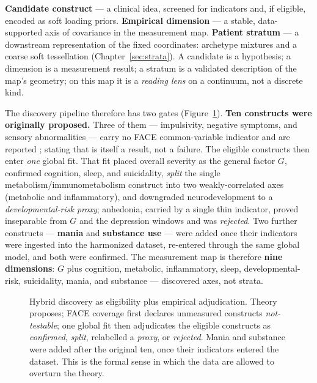 \begin{definitionbox}
\textbf{Candidate construct} --- a clinical idea, screened for indicators and, if eligible, encoded as soft
loading priors.\quad
\textbf{Empirical dimension} --- a stable, data-supported axis of covariance in the measurement map.\quad
\textbf{Patient stratum} --- a downstream representation of the fixed coordinates: archetype mixtures and a
coarse soft tessellation (Chapter~\ref{sec:strata}). A candidate is a hypothesis; a dimension is a measurement
result; a stratum is a validated description of the map's geometry; on this map it is a \emph{reading lens} on a continuum, not a discrete kind.
\end{definitionbox}

The discovery pipeline therefore has two gates (Figure~\ref{fig:discovery}). \textbf{Ten constructs were
originally proposed.} Three of them --- impulsivity, negative symptoms, and sensory abnormalities --- carry no
FACE common-variable indicator and are reported ; stating that is itself a result, not a
failure. The eligible constructs then enter \emph{one} global fit. That fit placed overall severity as the
general factor $G$, confirmed cognition, sleep, and suicidality, \emph{split} the single
metabolism/immunometabolism construct into two weakly-correlated axes (metabolic and inflammatory), and
downgraded neurodevelopment to a \emph{developmental-risk proxy}; anhedonia, carried by a single thin
indicator, proved inseparable from $G$ and the depression windows and was \emph{rejected}. Two further
constructs --- \textbf{mania} and \textbf{substance use} --- were added once their indicators were ingested into
the harmonized dataset, re-entered through the same global model, and both were confirmed. The measurement map
is therefore \textbf{nine dimensions}:
$G$ plus cognition, metabolic, inflammatory, sleep, developmental-risk, suicidality, mania, and substance ---
discovered axes, not strata.

\begin{figure}[h]\centering
\discoveryflow
\caption{Hybrid discovery as eligibility plus empirical adjudication. Theory proposes; FACE coverage first
declares unmeasured constructs \emph{not-testable}; one global fit then adjudicates the eligible constructs as
\emph{confirmed}, \emph{split}, relabelled a \emph{proxy}, or \emph{rejected}. Mania and substance were added
after the original ten, once their indicators entered the dataset. This is the formal sense in which the data
are allowed to overturn the theory.}
\label{fig:discovery}
\end{figure}

